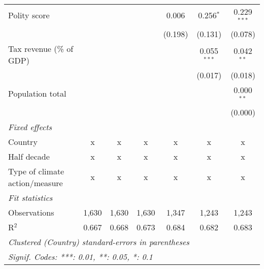 \begin{tabular}{lcccccc}
   Polity score                                                  &             &              &                & 0.006          & 0.256$^{*}$    & 0.229$^{***}$\\   
                                                                 &             &              &                & (0.198)        & (0.131)        & (0.078)\\   
   Tax revenue (\% of GDP)                                       &             &              &                &                & 0.055$^{***}$  & 0.042$^{**}$\\   
                                                                 &             &              &                &                & (0.017)        & (0.018)\\   
   Population total                                              &             &              &                &                &                & 0.000$^{**}$\\   
                                                                 &             &              &                &                &                & (0.000)\\   
   \emph{Fixed effects}\\
   Country                                                       & x           & x            & x              & x              & x              & x\\  
   Half decade                                                   & x           & x            & x              & x              & x              & x\\  
   Type of climate action/measure                                & x           & x            & x              & x              & x              & x\\  
   \midrule \emph{Fit statistics}\\
   Observations                                                  & 1,630       & 1,630        & 1,630          & 1,347          & 1,243          & 1,243\\  
   R$^2$                                                         & 0.667       & 0.668        & 0.673          & 0.684          & 0.682          & 0.683\\  
   \midrule
   \multicolumn{7}{l}{\emph{Clustered (Country) standard-errors in parentheses}}\\
   \multicolumn{7}{l}{\emph{Signif. Codes: ***: 0.01, **: 0.05, *: 0.1}}\\
\end{tabular}
\par\endgroup


